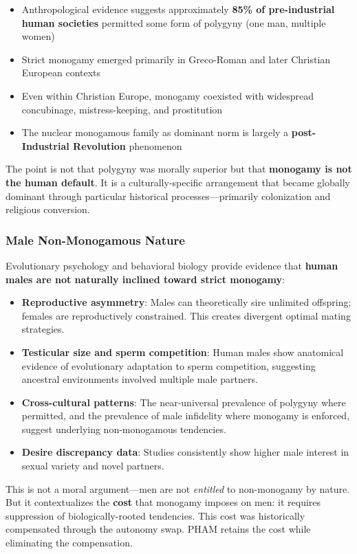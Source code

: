\documentclass[12pt, letterpaper]{article}
\begin{document}
\begin{itemize}
    \item Anthropological evidence suggests approximately \textbf{85\% of pre-industrial human societies} permitted some form of polygyny (one man, multiple women)
    \item Strict monogamy emerged primarily in Greco-Roman and later Christian European contexts
    \item Even within Christian Europe, monogamy coexisted with widespread concubinage, mistress-keeping, and prostitution
    \item The nuclear monogamous family as dominant norm is largely a \textbf{post-Industrial Revolution} phenomenon
\end{itemize}

The point is not that polygyny was morally superior but that \textbf{monogamy is not the human default}. It is a culturally-specific arrangement that became globally dominant through particular historical processes---primarily colonization and religious conversion.

\subsubsection{Male Non-Monogamous Nature}

Evolutionary psychology and behavioral biology provide evidence that \textbf{human males are not naturally inclined toward strict monogamy}:

\begin{itemize}
    \item \textbf{Reproductive asymmetry}: Males can theoretically sire unlimited offspring; females are reproductively constrained. This creates divergent optimal mating strategies.
    \item \textbf{Testicular size and sperm competition}: Human males show anatomical evidence of evolutionary adaptation to sperm competition, suggesting ancestral environments involved multiple male partners.
    \item \textbf{Cross-cultural patterns}: The near-universal prevalence of polygyny where permitted, and the prevalence of male infidelity where monogamy is enforced, suggest underlying non-monogamous tendencies.
    \item \textbf{Desire discrepancy data}: Studies consistently show higher male interest in sexual variety and novel partners.
\end{itemize}

This is not a moral argument---men are not \textit{entitled} to non-monogamy by nature. But it contextualizes the \textbf{cost} that monogamy imposes on men: it requires suppression of biologically-rooted tendencies. This cost was historically compensated through the autonomy swap. PHAM retains the cost while eliminating the compensation.
\end{document}
